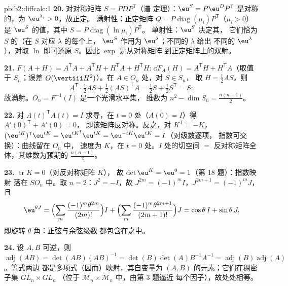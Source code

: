 \begin{solution}{pb:b2:diffcalc:1}
\textbf{20.} 对对称矩阵 $S = PDP^{\mathsf T}$（谱
定理）：$\eu^S = P\eu^DP^{\mathsf T}$ 是对称的，为
$\eu^{\lambda_i} > 0$，故正定。
满射性：正定矩阵 $Q =
P\operatorname{diag}(\mu_i)P^{\mathsf T}$（$\mu_i > 0$）是
$\eu^S$ 的值，其中 $S = P\operatorname{diag}(\ln\mu_i)P^{\mathsf T}$。
单射性：$\eu^S$ 决定其，
它们恰为 $S$ 的（在 $S$ 对应 $\lambda$ 的每个上，
$\eu^S$ 作用为 $\eu^\lambda$；不同的 $\lambda$ 给出
不同的 $\eu^\lambda$），对取 $\ln$
即可还原 $S$。因此 $\exp$ 是从对称矩阵
到正定矩阵上的双射。

\textbf{21.} $F(A + H) = A^{\mathsf T}A + A^{\mathsf T}H +
H^{\mathsf T}A + H^{\mathsf T}H$: $\dd F_A(H) =
A^{\mathsf T}H + H^{\mathsf T}A$（取值于 $S_n$；误差
$O(\vertiii H^2)$）。在 $A \in O_n$ 处，对 $S \in S_n$，
取 $H = \frac12AS$，则
\[
A^{\mathsf T}\cdot\tfrac12AS + \tfrac12(AS)^{\mathsf T}A
= \tfrac12 S + \tfrac12 S^{\mathsf T} = S :
\]
故满射。$O_n = F^{-1}(I)$ 是一个光滑水平集，
维数为 $n^2 - \dim S_n = \frac{n(n-1)}2$。

\textbf{22.} 对 $A(t)^{\mathsf T}A(t) = I$ 求导，在 $t
= 0$ 处（$A(0) = I$）得 $A'(0)^{\mathsf T} + A'(0) = 0$，
即该矩阵反对称。反之，对 $K^{\mathsf T} = -K$，
$(\eu^{tK})^{\mathsf T}\eu^{tK} = \eu^{tK^{\mathsf T}}
\eu^{tK} = \eu^{-tK}\eu^{tK} = I$（对级数逐项，
指数可交换）：曲线留在 $O_n$ 中，
速度为 $K$，在 $t = 0$ 处。$I$ 处的切空间 $=$
反对称矩阵全体，其维数为预期的
$\frac{n(n-1)}2$。

\textbf{23.} $\operatorname{tr}K = 0$（对反对称矩阵 $K$），
故 $\det\eu^K = \eu^0 = 1$（第 18 题）：指数映射
落在 $SO_n$ 中。取 $n = 2$：$J^2 = -I$，故 $J^{2m} =
(-1)^mI$，$J^{2m+1} = (-1)^mJ$，且
\[
\eu^{\theta J}
= \Bigl(\sum_m\frac{(-1)^m\theta^{2m}}{(2m)!}\Bigr)I
+ \Bigl(\sum_m\frac{(-1)^m\theta^{2m+1}}{(2m+1)!}\Bigr)J
= \cos\theta\,I + \sin\theta\,J ,
\]
即旋转 $\theta$ 角：正弦与余弦级数
都包含在之中。

\textbf{24.} 设 $A, B$ 可逆，则 $\operatorname{adj}(AB) =
\det(AB)(AB)^{-1} = \det(B)\det(A)B^{-1}A^{-1} =
\operatorname{adj}(B)\operatorname{adj}(A)$。等式两边
都是多项式（因而）映射，其自变量为
$(A, B)$ 的元素；它们在稠密子集 $GL_n\times GL_n$
（位于 $\mathcal M_n\times\mathcal M_n$ 中，由第 3 题逼近
每个因子），故处处相等。


\end{solution}
